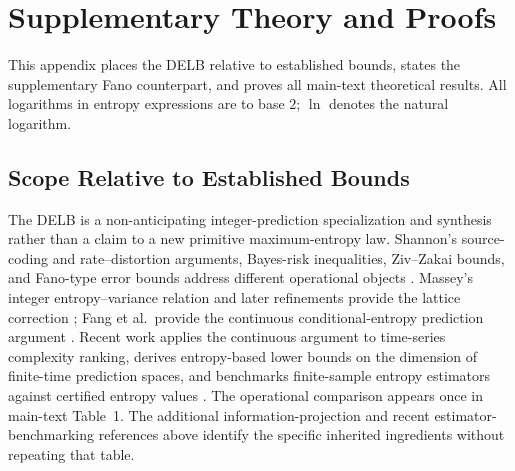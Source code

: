 \section{Supplementary Theory and Proofs}
\label{app:proofs}

\makeatletter
{}
\makeatother

This appendix places the DELB relative to established bounds, states the
supplementary Fano counterpart, and proves all main-text theoretical results.
All logarithms in entropy expressions are to base \(2\); \(\ln\) denotes the
natural logarithm.

\subsection{Scope Relative to Established Bounds}
\label{subsec:prior_bound_scope}

The DELB is a non-anticipating integer-prediction specialization and synthesis rather
than a claim to a new primitive maximum-entropy law. Shannon's source-coding
and rate--distortion arguments, Bayes-risk inequalities, Ziv--Zakai bounds,
and Fano-type error bounds address different operational objects
\citep{shannon1948,shannon_rate_distortion,chen_bayes_risk,
jeong_ziv_zakai,feder_merhav}. Massey's integer entropy--variance relation
and later refinements provide the lattice correction
\citep{massey_integer_entropy,rioul_massey}; Fang et al.\ provide the
continuous conditional-entropy prediction argument
\citep{fang_variance_bounds}. Recent work applies the continuous argument to
time-series complexity ranking, derives entropy-based lower bounds on the
dimension of finite-time prediction spaces, and benchmarks finite-sample
entropy estimators against certified entropy values
\citep{ayers2025complexity,hauser2026dmd,calcagnile2026benchmark}.
The operational comparison appears once in main-text Table~1. The additional
information-projection and recent estimator-benchmarking references above
identify the specific inherited ingredients without repeating that table.

